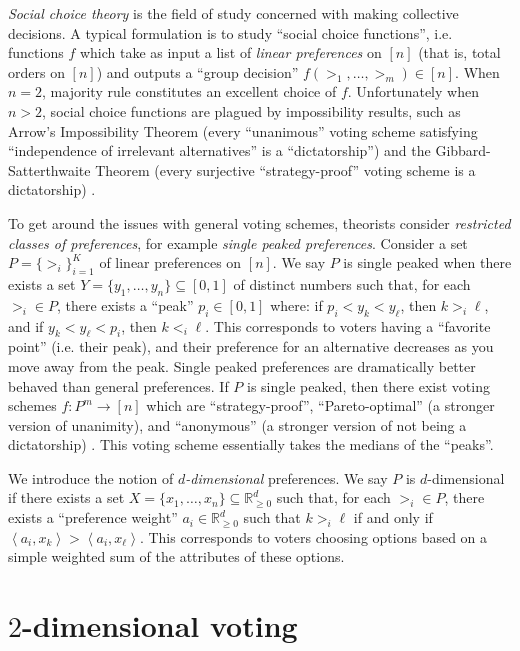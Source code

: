 \documentclass[12pt]{article}
\newcommand{\R}{\mathbb{R}}
\newcommand{\ip}[2]{\left\langle{#1},{#2}\right\rangle}
\newcommand{\1}[1]{\mathds{1}[{#1}]}
\begin{document}
  \emph{Social choice theory} is the field of study
  concerned with making collective decisions. A typical formulation
  is to study ``social choice functions'', i.e.
  functions $f$ which take as input a list of \emph{linear
  preferences} on $[n]$ (that is, total orders on $[n]$) and outputs a
  ``group decision'' $f(>_1,\ldots,>_m) \in [n]$.
  When $n = 2$, majority rule constitutes an excellent choice of $f$.
  Unfortunately when $n>2$, social choice functions are
  plagued by impossibility results,
  such as Arrow's Impossibility Theorem (every ``unanimous'' voting scheme
  satisfying ``independence of irrelevant alternatives'' is a ``dictatorship'')
  and the Gibbard-Satterthwaite Theorem (every surjective 
  ``strategy-proof'' voting scheme is a dictatorship) 
  \cite{AgtBookMechDesignInto}.

  To get around the issues with general voting schemes, theorists
  consider \emph{restricted classes of preferences},
  for example \emph{single peaked preferences}.
  Consider a set $P = \{>_i\}_{i=1}^K$ of linear preferences on $[n]$.
  We say $P$ is single peaked when there exists a set
  $Y = \{y_1,\ldots,y_n\} \subseteq [0,1]$ of distinct numbers such that,
  for each $>_i \in P$, there exists a ``peak'' $p_i \in [0,1]$
  where: if $p_i < y_k < y_\ell$, then $k >_i \ell$,
  and if $y_k < y_\ell < p_i$, then $k <_i \ell$.
  This corresponds to voters having a ``favorite point'' (i.e.
  their peak), and their preference for an alternative decreases
  as you move away from the peak.
  Single peaked preferences are dramatically better behaved
  than general preferences.
  If $P$ is single peaked, then there exist voting schemes
  $f : P^m \to [n]$ which are ``strategy-proof'',
  ``Pareto-optimal'' (a stronger
  version of unanimity), and ``anonymous'' (a stronger version
  of not being a dictatorship) \cite{AgtBookNoMoney}.
  This voting scheme essentially takes the medians of the ``peaks''.

  We introduce the notion of \emph{$d$-dimensional} preferences.
  We say $P$ is $d$-dimensional if there exists a set
  $X = \{x_1,\ldots,x_n\} \subseteq \R_{\ge 0}^d$ such that, for each $>_i \in P$,
  there exists a ``preference weight'' $a_i\in \R_{\ge 0}^d$ such that
  $k >_i \ell$ if and only if $\ip{a_i}{x_k} > \ip{a_i}{x_\ell}$.
  This corresponds to voters choosing options based on a simple weighted
  sum of the attributes of these options.

\section*{$2$-dimensional voting}
\end{document}
